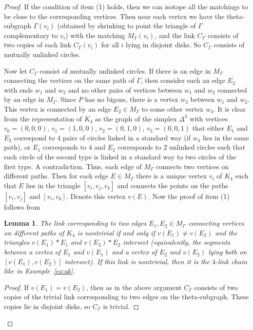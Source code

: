 \documentclass[12pt]{amsart}
\newtheorem{lemma}[formula]{Lemma}
\theoremstyle{definition}
\theoremstyle{remark}
\begin{document}
\begin{proof}
If the condition of item (1) holds, then we can isotope all the matchings to be close to the corresponding vertices.
Then near each vertex we have the theta-subgraph $\Gamma(v_i)$ (obtained by shrinking to point the triangle of $\Gamma$
complementary to $v_i$) with the matching $M_{\Gamma}(v_i)$, and the link $C_\Gamma$ 
consists of two copies of each link $C_\Gamma(v_i)$ for all $i$ 
lying in disjoint disks. So $C_\Gamma$ consists of mutually unlinked circles.

Now let $C_\Gamma$ consist of mutually unlinked circles. If there is an edge in $M_\Gamma$ connecting the vertices
on the same path of $\Gamma$, then consider such an edge $E_2$ with ends $w_1$ and $w_2$ and no other pairs of vertices
between $w_1$ and $w_2$ connected by an edge in $M_\Gamma$. Since $P$ has no bigons, there is a vertex $w_3$ between $w_1$ and $w_2$. This vertex is connected by an edge $E_2\in M_\Gamma$ to some other vertex $w_4$. It is clear from 
the representation of $K_4$ as the graph of the simplex $\Delta^3$ 
with vertices $v_0=(0,0,0)$, $v_1=(1,0,0)$, $v_2=(0,1,0)$, $v_3=(0,0,1)$ that either
$E_1$ and $E_2$ correspond to $4$ pairs of circles linked in a standard way (if $w_4$ lies in the same path), or
$E_1$ corresponds to $4$ and $E_2$ corresponds to $2$ unlinked circles such that each circle of the second type
is linked in a standard way to two circles of the first type. A contradiction. Thus, each edge of  $M_\Gamma$
connects two vertices on different paths. Then for each edge $E\in M_\Gamma$ there is a unique vertex $v_i$ of $K_4$
such that $E$ lies in the triangle $[v_i,v_j,v_k]$ and connects the points on the paths $[v_i,v_j]$ and $[v_i,v_k]$.
Denote this vertex $v(E)$. Now the proof of item (1) follows from
\begin{lemma}
The link corresponding to two edges $E_1,E_2\in M_\Gamma$ connecting vertices on different paths of $K_4$
is nontrivial if and only if $v(E_1)\ne v(E_2)$ and the triangles $v(E_1)*E_1$ and $v(E_2)*E_2$ intersect 
(equivalently, the segments between a vertex of $E_1$ and $v(E_1)$ and a vertex of $E_2$ and $v(E_2)$ lying
both on $[v(E_1), v(E_2)]$ intersect). If this link is nontrivial, then it is the $4$-link chain like in Example~\ref{ex:ak}. 
\end{lemma}
\begin{proof} 
If $v(E_1)=v(E_2)$, then as in the above argument $C_\Gamma$ consists of two copies of the trivial link corresponding to
two edges on the theta-subgraph. These copies lie in disjoint disks, so $C_\Gamma$ is trivial.


\end{proof}
\end{proof}
\end{document}
